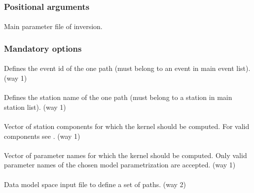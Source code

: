 \subsubsection{Positional arguments}
\paragraph{}
Main parameter file of inversion.
\subsubsection{Mandatory options}
\paragraph{ } 
Defines the event id of the one path (must belong to an event in main event list). (way 1)
\paragraph{ }
Defines the station name of the one path (must belong to a station in main station list). (way 1)
\paragraph{ }
Vector of station components for which the kernel should be computed. 
For valid components see . (way 1)
\paragraph{ }
Vector of parameter names for which the kernel should be computed. 
Only valid parameter names of the chosen model parametrization are accepted. (way 1)
\paragraph{ }
Data model space input file to define a set of paths. (way 2)
